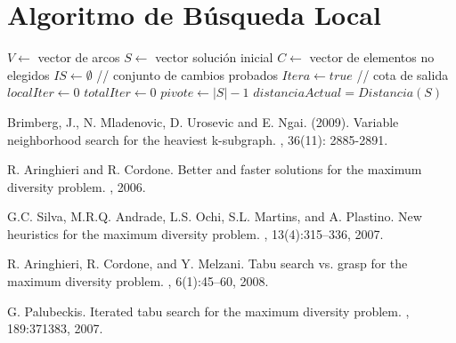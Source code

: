 \documentclass{ci5652}
\begin{document}
\section{Algoritmo de Búsqueda Local}
\begin{algorithm}
  \DontPrintSemicolon
  \vspace*{0.1cm}
  $V \leftarrow$ vector de arcos\;
  $S \leftarrow$ vector solución inicial\;
  $C \leftarrow$ vector de elementos no elegidos\;
  $IS \leftarrow \emptyset$ // conjunto de cambios probados\;
  $Itera \leftarrow true$ // cota de salida\;
  $localIter \leftarrow 0$\;
  $totalIter \leftarrow 0$\;
  $pivote \leftarrow |S|-1$\;
  $distanciaActual = Distancia(S)$\;
\end{algorithm}


\small


\begin{thebibliography}{99}

Brimberg, J., N. Mladenovic, D. Urosevic and E. Ngai. (2009).
\newblock Variable neighborhood search for the heaviest k-subgraph.
, 36(11): 2885-2891.

R. Aringhieri and R. Cordone.
\newblock Better and faster solutions for the maximum diversity problem.
, 2006.

G.C. Silva, M.R.Q. Andrade, L.S. Ochi, S.L. Martins, and A. Plastino.
\newblock New heuristics for the maximum diversity problem.
, 13(4):315–336, 2007.

R. Aringhieri, R. Cordone, and Y. Melzani.
\newblock Tabu search vs. grasp for the maximum diversity problem.
, 6(1):45–60, 2008.

G. Palubeckis.
\newblock Iterated tabu search for the maximum diversity problem.
, 189:371383, 2007.




\end{thebibliography}
\end{document}
